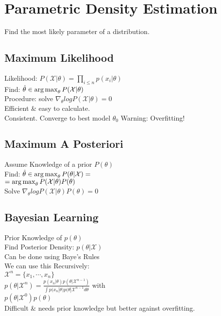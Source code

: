 \section*{Parametric Density Estimation}
Find the most likely parameter of a distribution.

\subsection*{Maximum Likelihood}
Likelihood: $P(\mathcal{X}|\theta)=\prod_{i\leq n}p(x_i|\theta)$\\
Find: $\hat{\theta}\in \operatorname*{arg\,max}_\theta P(\mathcal{X}|\theta)$\\
Procedure: solve $\nabla_\theta log P(\mathcal{X}|\theta)=0$\\
Efficient \& easy to calculate.\\
Consistent. Converge to best model $\theta_0$
Warning: Overfitting!

\subsection*{Maximum A Posteriori}
Assume Knowledge of a prior $P(\theta)$\\
Find: $\hat{\theta}\in \operatorname*{arg\,max}_\theta P(\theta|\mathcal{X}) =$\\
$=\operatorname*{arg\,max}_\theta P(\mathcal{X}|\theta)P(\theta)$\\
Solve $\nabla_\theta log P(\mathcal{X}|\theta)P(\theta)=0$

\subsection*{Bayesian Learning}
Prior Knowledge of $p(\theta)$\\
Find Posterior Density: $p(\theta|\mathcal{X})$\\
Can be done using Baye's Rules\\
We can use this Recursively:\\
$\mathcal{X}^n=\{x_1, \cdots, x_n\}$\\
$p(\theta|\mathcal{X}^n)=\frac{p(x_n|\theta)p(\theta|\mathcal{X}^{n-1})}{\int p(x_n|\theta)p(\theta|\mathcal{X}^{n-1} d\theta}$ with\\
$p(\theta|\mathcal{X}^0)p(\theta)$\\
Difficult \& needs prior knowledge but better against overfitting.